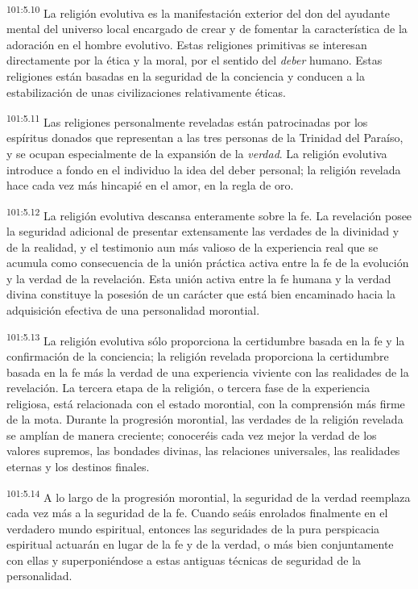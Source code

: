 \par
\textsuperscript{101:5.10} La religión evolutiva es la manifestación exterior del don del ayudante mental del universo local encargado de crear y de fomentar la característica de la adoración en el hombre evolutivo. Estas religiones primitivas se interesan directamente por la ética y la moral, por el sentido del \textit{deber} humano. Estas religiones están basadas en la seguridad de la conciencia y conducen a la estabilización de unas civilizaciones relativamente éticas.

\par
\textsuperscript{101:5.11} Las religiones personalmente reveladas están patrocinadas por los espíritus donados que representan a las tres personas de la Trinidad del Paraíso, y se ocupan especialmente de la expansión de la \textit{verdad}. La religión evolutiva introduce a fondo en el individuo la idea del deber personal; la religión revelada hace cada vez más hincapié en el amor, en la regla de oro.

\par
\textsuperscript{101:5.12} La religión evolutiva descansa enteramente sobre la fe. La revelación posee la seguridad adicional de presentar extensamente las verdades de la divinidad y de la realidad, y el testimonio aun más valioso de la experiencia real que se acumula como consecuencia de la unión práctica activa entre la fe de la evolución y la verdad de la revelación. Esta unión activa entre la fe humana y la verdad divina constituye la posesión de un carácter que está bien encaminado hacia la adquisición efectiva de una personalidad morontial.

\par
\textsuperscript{101:5.13} La religión evolutiva sólo proporciona la certidumbre basada en la fe y la confirmación de la conciencia; la religión revelada proporciona la certidumbre basada en la fe más la verdad de una experiencia viviente con las realidades de la revelación. La tercera etapa de la religión, o tercera fase de la experiencia religiosa, está relacionada con el estado morontial, con la comprensión más firme de la mota. Durante la progresión morontial, las verdades de la religión revelada se amplían de manera creciente; conoceréis cada vez mejor la verdad de los valores supremos, las bondades divinas, las relaciones universales, las realidades eternas y los destinos finales.

\par
\textsuperscript{101:5.14} A lo largo de la progresión morontial, la seguridad de la verdad reemplaza cada vez más a la seguridad de la fe. Cuando seáis enrolados finalmente en el verdadero mundo espiritual, entonces las seguridades de la pura perspicacia espiritual actuarán en lugar de la fe y de la verdad, o más bien conjuntamente con ellas y superponiéndose a estas antiguas técnicas de seguridad de la personalidad.


